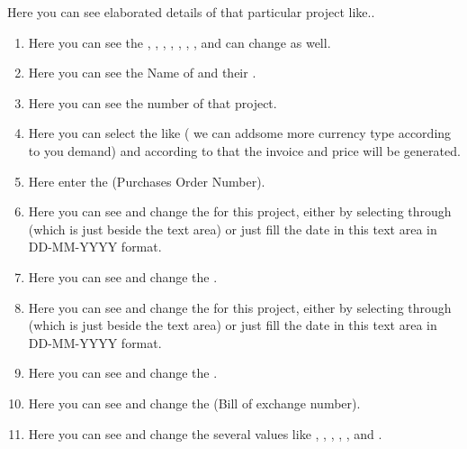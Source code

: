 \documentclass[letterpaper,10pt,english]{sphinxmanual}
\begin{document}
Here you can see elaborated details of that particular project like..
\begin{enumerate}
\item {} 
Here you can see the  ,  ,  ,  ,  ,  ,  ,  and can change as well.

\item {} 
Here you can see the Name of  and their  .

\item {} 
Here you can see the  number of that project.

\item {} 
Here you can select the  like  ( we can addsome more currency type according to you demand) and according to that the invoice and price will be generated.

\item {} 
Here enter the  (Purchases Order Number).

\item {} 
Here you can see and change the  for this project, either by selecting through  (which is just beside the text area) or just fill the date in this text area in DD-MM-YYYY format.

\item {} 
Here you can see and change the  .

\item {} 
Here you can see and change the  for this project, either by selecting through  (which is just beside the text area) or just fill the date in this text area in DD-MM-YYYY format.

\item {} 
Here you can see and change the  .

\item {} 
Here you can see and change the  (Bill of exchange number).

\item {} 
Here you can see and change the several values like  ,  ,  ,  ,  ,  and  .

\end{enumerate}
\end{document}
